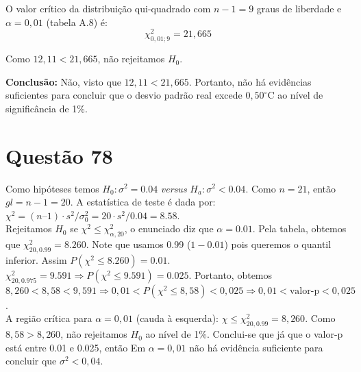 \documentclass[12pt]{article}
\newcommand{\quest}[1]{\section*{Questão #1}} %
\begin{document}
O valor crítico da distribuição qui-quadrado com $n - 1 = 9$ graus de liberdade e $\alpha = 0{,}01$ (tabela A.8) é:
\[
\chi^2_{0{,}01;9} = 21{,}665
\]

Como $12{,}11 < 21{,}665$, não rejeitamos $H_0$.

\textbf{Conclusão:} Não, visto que $12{,}11 < 21{,}665$. Portanto, não há evidências suficientes para concluir que o desvio padrão real excede $0{,}50^\circ$C ao nível de significância de 1\%.

\quest{78}
Como hipóteses temos $H_0: \sigma^2 = 0.04$ \textit{versus} $H_a: \sigma^2 < 0.04$. Como $n=21$, então $gl = n-1 = 20$. A estatística de teste é dada por: $\chi^2 = (n – 1)·s^2/σ_0^2 = 20·s^2/0.04 = 8.58$.\\Rejeitamos $H_0$ se $\chi^2 \le \chi^2_{\alpha, 20}$, o enunciado diz que $\alpha = 0.01$. Pela tabela, obtemos que $\chi^2_{20,0.99} = 8.260$. Note que usamos 0.99 ($1-0.01$) pois queremos o quantil inferior. Assim $P(\chi^2 \le 8.260) = 0.01$.\\ $\chi^2_{20,0.975} = 9.591 \Rightarrow P(\chi^2 \le 9.591) = 0.025$. Portanto, obtemos $8,260 < 8,58 < 9,591 \Rightarrow 0,01 < P(\chi^2 \le 8,58) < 0,025 \Rightarrow 0,01 < \text{valor-p} < 0,025$.\\
A região crítica para $\alpha = 0,01$ (cauda à esquerda): $\chi \le \chi^2_{20,0.99} = 8,260$.
Como $8,58 > 8,260$, não rejeitamos $H_0$ ao nível de 1\%. Conclui-se que já que o valor-p está entre 0.01 e 0.025, então Em $\alpha = 0,01$ não há evidência suficiente para concluir que $\sigma^2 < 0,04$.
\end{document}

